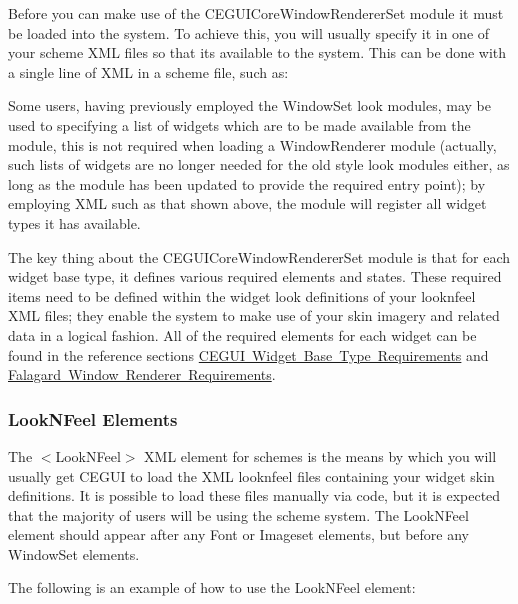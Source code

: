 Before you can make use of the C\+E\+G\+U\+I\+Core\+Window\+Renderer\+Set module it must be loaded into the system. To achieve this, you will usually specify it in one of your scheme X\+ML files so that it\textquotesingle{}s available to the system. This can be done with a single line of X\+ML in a scheme file, such as\+: 
\begin{DoxyCode}{0}
\end{DoxyCode}


Some users, having previously employed the Window\+Set \textquotesingle{}look\textquotesingle{} modules, may be used to specifying a list of widgets which are to be made available from the module, this is not required when loading a Window\+Renderer module (actually, such lists of widgets are no longer needed for the old style \textquotesingle{}look\textquotesingle{} modules either, as long as the module has been updated to provide the required entry point); by employing X\+ML such as that shown above, the module will register all widget types it has available.

The key thing about the C\+E\+G\+U\+I\+Core\+Window\+Renderer\+Set module is that for each widget base type, it defines various required elements and states. These required items need to be defined within the widget look definitions of your looknfeel X\+ML files; they enable the system to make use of your skin imagery and related data in a logical fashion. All of the required elements for each widget can be found in the reference sections \mbox{\hyperlink{fal_baseclass_ref}{C\+E\+G\+UI Widget Base Type Requirements}} and \mbox{\hyperlink{fal_wr_ref}{Falagard Window Renderer Requirements}}.\hypertarget{fal_intro_fal_looknfeel_elements}{}\subsubsection{Look\+N\+Feel Elements}\label{fal_intro_fal_looknfeel_elements}
The {\ttfamily $<$Look\+N\+Feel$>$} X\+ML element for schemes is the means by which you will usually get C\+E\+G\+UI to load the X\+ML \textquotesingle{}looknfeel\textquotesingle{} files containing your widget skin definitions. It is possible to load these files manually via code, but it is expected that the majority of users will be using the scheme system. The Look\+N\+Feel element should appear after any Font or Imageset elements, but before any Window\+Set elements.

The following is an example of how to use the Look\+N\+Feel element\+: 
\begin{DoxyCode}{0}
\end{DoxyCode}


